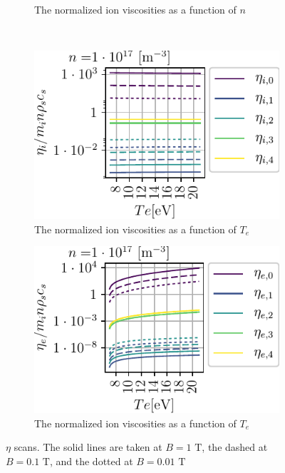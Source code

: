 \begin{figure}[t!]
\begin{subfigure}[t]{0.45\textwidth}
        \caption{The normalized ion viscosities as a function of $n$}
    \end{subfigure}
    \\
    \hfill
    \begin{subfigure}[t]{0.45\textwidth}
        \centering
        \includegraphics{fig/etaITScan}
        \caption{The normalized ion viscosities as a function of $T_e$}
    \end{subfigure}
    \hfill
    \begin{subfigure}[t]{0.45\textwidth}
        \centering
        \includegraphics{fig/etaETScan}
        \caption{The normalized ion viscosities as a function of $T_e$}
    \end{subfigure}
    \caption{$\eta$ scans. The solid lines are taken at $B=1\text{ T}$, the
        dashed at $B=0.1\text{ T}$, and the dotted at $B=0.01\text{ T}$}
    \label{fig:etas}
\end{figure}
%

